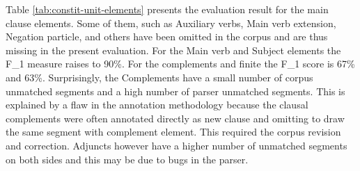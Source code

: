 
    Table \ref{tab:constit-unit-elements} presents the evaluation result for the main clause elements. Some of them, such as Auxiliary verbs, Main verb extension, Negation particle, and others have been omitted in the corpus and are thus missing in the present evaluation. For the Main verb and Subject elements the F_1 measure raises to 90\%. For the complements and finite the F_1 score is 67\% and 63\%. Surprisingly, the Complements have a small number of corpus unmatched segments and a high number of parser unmatched segments. This is explained by a flaw in the annotation methodology because the clausal complements were often annotated directly as new clause and omitting to draw the same segment with complement element. This required the corpus revision and correction. Adjuncts however have a higher number of unmatched segments on both sides and this may be due to bugs in the parser.

